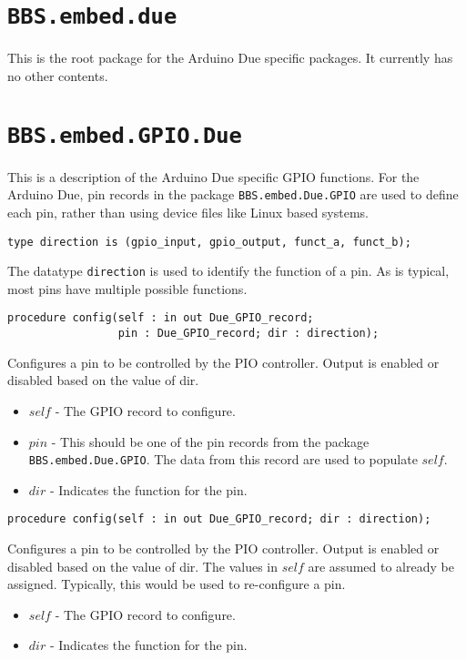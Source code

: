 \documentclass[10pt, openany]{book}
\newcommand{\indextype}[1]{\index[type]{#1}}
\newcommand{\indexfunc}[1]{\index[func]{#1}}
\newcommand{\package}[1]{\texttt{#1}}
\newcommand{\datatype}[1]{\texttt{#1}}
\begin{document}
\section{\package{BBS.embed.due}}
This is the root package for the Arduino Due specific packages.  It currently has no other contents.

\section{\package{BBS.embed.GPIO.Due}}
This is a description of the Arduino Due specific GPIO functions.  For the Arduino Due, pin records in the package \package{BBS.embed.Due.GPIO} are used to define each pin, rather than using device files like Linux based systems.

\begin{lstlisting}
type direction is (gpio_input, gpio_output, funct_a, funct_b);
\end{lstlisting}
\indextype{direction}
The datatype \datatype{direction} is used to identify the function of a pin.  As is typical, most pins have multiple possible functions.

\begin{lstlisting}
procedure config(self : in out Due_GPIO_record;
                 pin : Due_GPIO_record; dir : direction);
\end{lstlisting}
\indexfunc{config}
Configures a pin to be controlled by the PIO controller.  Output is enabled or disabled based on the value of dir.
\begin{itemize}
  \item $self$ - The GPIO record to configure.
  \item $pin$ - This should be one of the pin records from the package \package{BBS.embed.Due.GPIO}.  The data from this record are used to populate $self$.
  \item $dir$ - Indicates the function for the pin.
\end{itemize}

\begin{lstlisting}
procedure config(self : in out Due_GPIO_record; dir : direction);
\end{lstlisting}
\indexfunc{config}
Configures a pin to be controlled by the PIO controller.  Output is enabled or disabled based on the value of dir.  The values in $self$ are assumed to already be assigned.  Typically, this would be used to re-configure a pin.
\begin{itemize}
  \item $self$ - The GPIO record to configure.
  \item $dir$ - Indicates the function for the pin.
\end{itemize}
\end{document}
